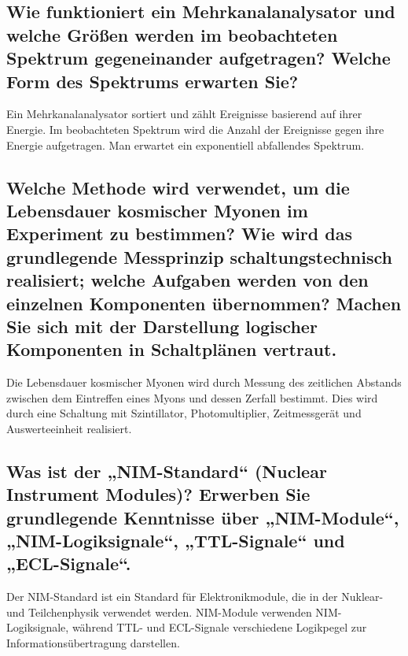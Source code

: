 \documentclass[a4paper,12pt]{article}
\begin{document}
{\subsection{Wie funktioniert ein Mehrkanalanalysator und welche Größen werden im beobachteten Spektrum gegeneinander aufgetragen? Welche Form des Spektrums erwarten Sie?}
Ein Mehrkanalanalysator sortiert und zählt Ereignisse basierend auf ihrer Energie. Im beobachteten Spektrum wird die Anzahl der Ereignisse gegen ihre Energie aufgetragen. Man erwartet ein exponentiell abfallendes Spektrum.

\subsection{Welche Methode wird verwendet, um die Lebensdauer kosmischer Myonen im Experiment zu bestimmen? Wie wird das grundlegende Messprinzip schaltungstechnisch realisiert; welche Aufgaben werden von den einzelnen Komponenten übernommen? Machen Sie sich mit der Darstellung logischer Komponenten in Schaltplänen vertraut.}
Die Lebensdauer kosmischer Myonen wird durch Messung des zeitlichen Abstands zwischen dem Eintreffen eines Myons und dessen Zerfall bestimmt. Dies wird durch eine Schaltung mit Szintillator, Photomultiplier, Zeitmessgerät und Auswerteeinheit realisiert.

\subsection{Was ist der „NIM-Standard“ (Nuclear Instrument Modules)? Erwerben Sie grundlegende Kenntnisse über „NIM-Module“, „NIM-Logiksignale“, „TTL-Signale“ und „ECL-Signale“.}
Der NIM-Standard ist ein Standard für Elektronikmodule, die in der Nuklear- und Teilchenphysik verwendet werden. NIM-Module verwenden NIM-Logiksignale, während TTL- und ECL-Signale verschiedene Logikpegel zur Informationsübertragung darstellen.
}
\end{document}
